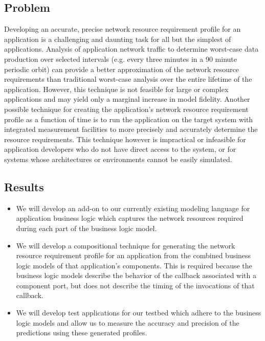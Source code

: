 \subsection{Problem}
Developing an accurate, precise network resource requirement profile
for an application is a challenging and daunting task for all but the
simplest of applications.  Analysis of application network traffic to
determine worst-case data production over selected intervals
(e.g. every three minutes in a 90 minute periodic orbit) can provide a
better approximation of the network resource requirements than
traditional worst-case analysis over the entire lifetime of the
application.  However, this technique is not feasible for large or
complex applications and may yield only a marginal increase in model
fidelity.  Another possible technique for creating the application's
network resource requirement profile as a function of time is to run
the application on the target system with integrated measurement
facilities to more precisely and accurately determine the resource
requirements.  This technique however is impractical or infeasible for
application developers who do not have direct access to the system, or
for systems whose architectures or environments cannot be easily
simulated.

\subsection{Results}
\begin{itemize}
	\item We will develop an add-on to our currently existing
          modeling language for application business logic which
          captures the network resources required during each part of
          the business logic model.
	\item We will develop a compositional technique for generating
          the network resource requirement profile for an application
          from the combined business logic models of that
          application's components.  This is required because the
          business logic models describe the behavior of the callback
          associated with a component port, but does not describe the
          timing of the invocations of that callback.
	\item We will develop test applications for our testbed which
          adhere to the business logic models and allow us to measure
          the accuracy and precision of the predictions using these
          generated profiles.
\end{itemize}

\fi
